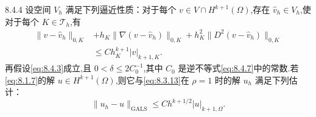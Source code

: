 \begin{proposition}[]{8.4.4}
设空间 \(V_h\) 满足下列逼近性质：对于每个 \(v\in V\cap H^{k+1}(\Omega)\),存在 \(\widehat v_h\in V_h\),使对于每个 \(K\in\mathcal T_h\),有
\begin{equation}\label{eq:8.4.18}
  \begin{aligned}
    \|v-\widehat v_h\|_{0,K}&+h_K\|\nabla(v-\widehat v_h)\|_{0,K}
      +h_K^2\|D^2(v-\widehat v_h)\|_{0,K}\\
      &\le Ch_K^{k+1}|v|_{k+1,K}.
  \end{aligned}
\end{equation}
再假设\eqref{eq:8.4.3}成立,且 \(0<\delta\le2C_0^{-1}\),其中 \(C_0\) 是逆不等式\eqref{eq:8.4.7}中的常数.若\eqref{eq:8.1.7}的解 \(u\in H^{k+1}(\Omega)\),则它与\eqref{eq:8.3.13}在 \(\rho=1\) 时的解 \(u_h\) 满足下列估计：
\begin{equation}\label{eq:8.4.19}
  \|u_h-u\|_{\mathrm{GALS}}\le Ch^{k+1/2}|u|_{k+1,\Omega}.
\end{equation}
\end{proposition}

